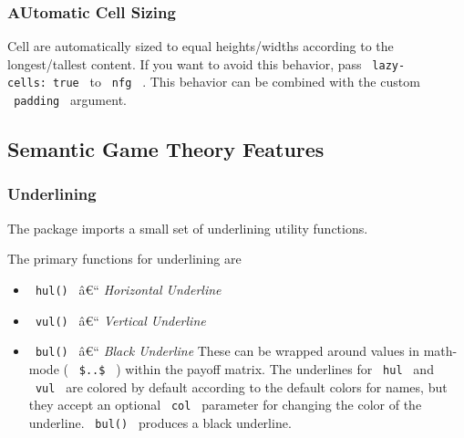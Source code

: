 \subsubsection{AUtomatic Cell Sizing}\label{automatic-cell-sizing}

Cell are automatically sized to equal heights/widths according to the
longest/tallest content. If you want to avoid this behavior, pass
\texttt{\ lazy-cells:\ true\ } to \texttt{\ nfg\ } . This behavior can
be combined with the custom \texttt{\ padding\ } argument.

\subsection{Semantic Game Theory
Features}\label{semantic-game-theory-features}

\subsubsection{Underlining}\label{underlining}

The package imports a small set of underlining utility functions.

The primary functions for underlining are

\begin{itemize}
\tightlist
\item
  \texttt{\ hul()\ } â€`` \emph{Horizontal Underline}
\item
  \texttt{\ vul()\ } â€`` \emph{Vertical Underline}
\item
  \texttt{\ bul()\ } â€`` \emph{Black Underline} These can be wrapped
  around values in math-mode ( \texttt{\ \$..\$\ } ) within the payoff
  matrix. The underlines for \texttt{\ hul\ } and \texttt{\ vul\ } are
  colored by default according to the default colors for names, but they
  accept an optional \texttt{\ col\ } parameter for changing the color
  of the underline. \texttt{\ bul()\ } produces a black underline.
\end{itemize}

\begin{Shaded}
\begin{Highlighting}[]
\NormalTok{  [$3,3$], [$4,4$], [$5,5$],}
\NormalTok{)}
\end{Highlighting}
\end{Shaded}

